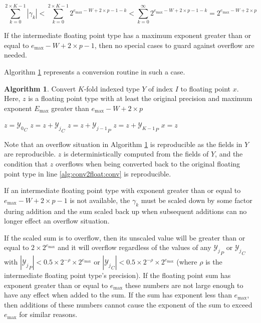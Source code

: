 \documentclass[12pt]{article}
\providecommand{\max}{\ensuremath{\text{max}}}
\providecommand{\To}{\ensuremath{\text{ to }}}
\theoremstyle{definition}
\newtheorem{alg}{Algorithm}[section]
\numberwithin{equation}{section}
\numberwithin{figure}{section}
\begin{document}
    \begin{equation}
      \label{eq:maxindexedvalue}
      \sum\limits_{k = 0}^{2 \times K - 1} |\gamma_k| < \sum\limits_{k = 0}^{2 \times K - 1} 2^{e_{\max} - W + 2 \times p - 1 - k} < \sum\limits_{k = 0}^{\infty} 2^{e_{\max} - W + 2 \times p - 1 - k} = 2^{e_{\max} - W + 2 \times p}
    \end{equation}

    If the intermediate floating point type has a maximum exponent greater than or equal to $e_{\max} - W + 2 \times p - 1$, then no special cases to guard against overflow are needed.

    Algorithm \ref{alg:conv2float} represents a conversion routine in such a case.

    \begin{samepage}
    \begin{alg}
      Convert $K$-fold indexed type $Y$ of index $I$ to floating point $x$. Here, $z$ is a floating point type with at least the original precision and maximum exponent $E_{\max}$ greater than $e_{\max} - W + 2 \times p$
      \begin{algorithmic}[1]
          \State $z = {\mathcal{Y}_0}_C$
          \For{$j = 1 \To K - 1$}
            \State $z = z + {\mathcal{Y}_j}_C$
            \State $z = z + {\mathcal{Y}_{j - 1}}_P$
          \EndFor
          \State $z = z + {\mathcal{Y}_{K - 1}}_P$
          \State $x = z$ \label{alg:conv2float:conv}
        \EndFunction
      \end{algorithmic}
      \label{alg:conv2float}
    \end{alg}
    \end{samepage}

    Note that an overflow situation in Algorithm \ref{alg:conv2float} is reproducible as the fields in $Y$ are reproducible. $z$ is deterministically computed from the fields of $Y$, and the condition that $z$ overflows when being converted back to the original floating point type in line \ref{alg:conv2float:conv} is reproducible.

    If an intermediate floating point type with exponent greater than or equal to $e_{\max} - W + 2 \times p - 1$ is not available, the $\gamma_k$ must be scaled down by some factor during addition and the sum scaled back up when subsequent additions can no longer effect an overflow situation.

    If the scaled sum is to overflow, then its unscaled value will be greater than or equal to $2 \times 2^{e_{\max}}$ and it will overflow regardless of the values of any ${\mathcal{Y}_j}_P$ or ${\mathcal{Y}_j}_C$ with $|{\mathcal{Y}_j}_P| < 0.5 \times 2^{-\rho} \times 2^{e_{\max}}$ or $|{\mathcal{Y}_j}_C| < 0.5 \times 2^{-\rho} \times 2^{e_{\max}}$ (where $\rho$ is the intermediate floating point type's precision). If the floating point sum has exponent greater than or equal to $e_{\max}$ these numbers are not large enough to have any effect when added to the sum. If the sum has exponent less than $e_{\max}$, then additions of these numbers cannot cause the exponent of the sum to exceed $e_{\max}$ for similar reasons.
\end{document}

